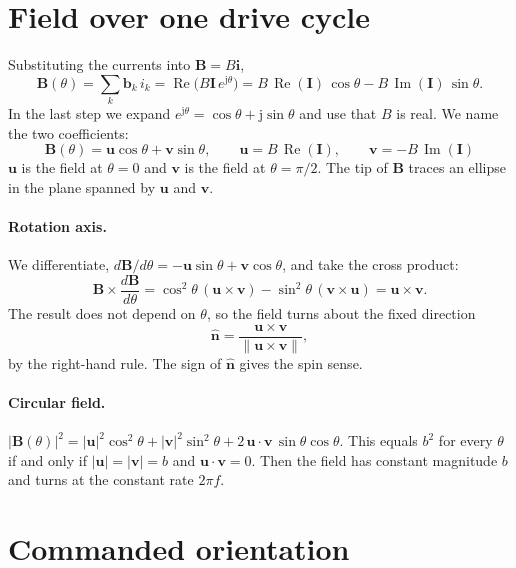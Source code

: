 \documentclass[11pt]{article}
\newcommand{\vb}[1]{\mathbf{#1}}
\newcommand{\uv}[1]{\hat{\mathbf{#1}}}
\newcommand{\jj}{\mathrm{j}}
\renewcommand{\Re}{\operatorname{Re}}
\renewcommand{\Im}{\operatorname{Im}}
\begin{document}
\section{Field over one drive cycle}

Substituting the currents into $\vb B = B\vb i$,
\begin{equation}
  \vb B(\theta) = \sum_k \vb b_k\, i_k
  = \Re\!\big(B\vb I\,e^{\jj\theta}\big)
  = B\,\Re(\vb I)\,\cos\theta - B\,\Im(\vb I)\,\sin\theta .
\end{equation}
In the last step we expand $e^{\jj\theta}=\cos\theta+\jj\sin\theta$ and use that $B$ is real. We
name the two coefficients:
\begin{equation}
  \boxed{\ \vb B(\theta) = \vb u\cos\theta + \vb v\sin\theta,\qquad
  \vb u = B\,\Re(\vb I),\qquad \vb v = -B\,\Im(\vb I)\ }
\end{equation}
$\vb u$ is the field at $\theta=0$ and $\vb v$ is the field at $\theta=\pi/2$. The tip of $\vb B$
traces an ellipse in the plane spanned by $\vb u$ and $\vb v$.

\paragraph{Rotation axis.} We differentiate, $d\vb B/d\theta = -\vb u\sin\theta + \vb v\cos\theta$,
and take the cross product:
\begin{equation}
  \vb B\times\frac{d\vb B}{d\theta}
  = \cos^2\theta\,(\vb u\times\vb v) - \sin^2\theta\,(\vb v\times\vb u)
  = \vb u\times\vb v .
\end{equation}
The result does not depend on $\theta$, so the field turns about the fixed direction
\begin{equation}
  \uv n = \frac{\vb u\times\vb v}{\lVert\vb u\times\vb v\rVert},
\end{equation}
by the right-hand rule. The sign of $\uv n$ gives the spin sense.

\paragraph{Circular field.} $|\vb B(\theta)|^2 = |\vb u|^2\cos^2\theta + |\vb v|^2\sin^2\theta
+ 2\,\vb u\cdot\vb v\,\sin\theta\cos\theta$. This equals $b^2$ for every $\theta$ if and only if
$|\vb u| = |\vb v| = b$ and $\vb u\cdot\vb v = 0$. Then the field has constant magnitude $b$ and
turns at the constant rate $2\pi f$.

\section{Commanded orientation}
\end{document}

